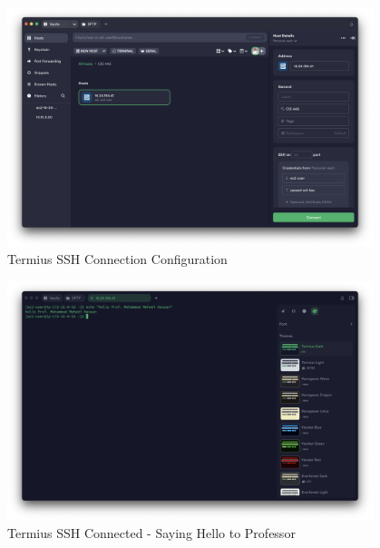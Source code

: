 \documentclass[a4paper,12pt]{article}
\begin{document}
\begin{figure}[H]
    \centering
    \includegraphics[width=0.95\textwidth]{termius-1.png}
    \caption{Termius SSH Connection Configuration}
    \label{fig:termius1}
\end{figure}

\begin{figure}[H]
    \centering
    \includegraphics[width=0.95\textwidth]{termius-2.png}
    \caption{Termius SSH Connected - Saying Hello to Professor}
    \label{fig:termius2}
\end{figure}
\end{document}
